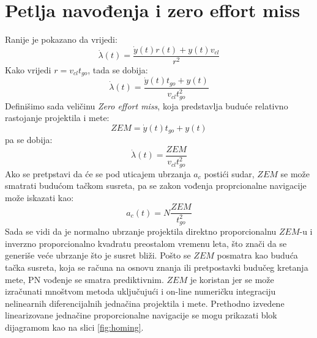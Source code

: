 \section{Petlja navođenja i zero effort miss}
Ranije je pokazano da vrijedi:
\begin{equation}
    \dot{\lambda}(t)=\frac{\dot{y}(t)r(t)+y(t)v_{cl}}{r^2}
\end{equation}
Kako vrijedi $r=v_{cl}t_{go}$, tada se dobija:
\begin{equation}
    \dot{\lambda}(t)=\frac{\dot{y}(t)t_{go}+y(t)}{v_{cl}t_{go}^2}
\end{equation}
Definišimo sada veličinu \textit{Zero effort miss}, koja predstavlja buduće relativno rastojanje projektila i mete:
\begin{equation}
    ZEM=\dot{y}(t)t_{go}+y(t)
\end{equation}
pa se dobija:
\begin{equation}
    \dot{\lambda}(t)=\frac{ZEM}{v_{cl}t_{go}^2}
\end{equation}
Ako se pretpstavi da će se pod uticajem ubrzanja $a_c$ postići sudar, $ZEM$ se može smatrati 
budućom tačkom susreta, pa se zakon vođenja proprcionalne navigacije može iskazati kao:
\begin{equation}
    a_c(t)=N\frac{ZEM}{t_{go}^2}
\end{equation}
Sada se vidi da je normalno ubrzanje projektila direktno proporcionalnu $ZEM$-u i inverzno proporcionalno
kvadratu preostalom vremenu leta, što znači da se generiše veće ubrzanje što je susret bliži.
Pošto se $ZEM$ posmatra kao buduća tačka susreta, koja se računa na osnovu znanja ili pretpostavki 
budučeg kretanja mete, PN vođenje se smatra prediktivnim. $ZEM$ je koristan jer se može izračunati 
mnoštvom metoda uključujući i on-line numeričku integraciju nelinearnih diferencijalnih jednačina projektila 
i mete. Prethodno izvedene linearizovane jednačine proporcionalne navigacije se mogu 
prikazati blok dijagramom kao na slici \ref{fig:homing}.
